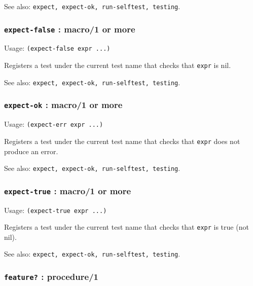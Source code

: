 \documentclass[
]{article}
\newcommand{\passthrough}[1]{#1}
\begin{document}
See also:
\passthrough{\lstinline!expect, expect-ok, run-selftest, testing!}.

\hypertarget{expect-false-macro1-or-more}{%
\subsubsection{\texorpdfstring{\texttt{expect-false} : macro/1 or
more}{expect-false : macro/1 or more}}\label{expect-false-macro1-or-more}}

Usage: \passthrough{\lstinline!(expect-false expr ...)!}

Registers a test under the current test name that checks that
\passthrough{\lstinline!expr!} is nil.

See also:
\passthrough{\lstinline!expect, expect-ok, run-selftest, testing!}.

\hypertarget{expect-ok-macro1-or-more}{%
\subsubsection{\texorpdfstring{\texttt{expect-ok} : macro/1 or
more}{expect-ok : macro/1 or more}}\label{expect-ok-macro1-or-more}}

Usage: \passthrough{\lstinline!(expect-err expr ...)!}

Registers a test under the current test name that checks that
\passthrough{\lstinline!expr!} does not produce an error.

See also:
\passthrough{\lstinline!expect, expect-ok, run-selftest, testing!}.

\hypertarget{expect-true-macro1-or-more}{%
\subsubsection{\texorpdfstring{\texttt{expect-true} : macro/1 or
more}{expect-true : macro/1 or more}}\label{expect-true-macro1-or-more}}

Usage: \passthrough{\lstinline!(expect-true expr ...)!}

Registers a test under the current test name that checks that
\passthrough{\lstinline!expr!} is true (not nil).

See also:
\passthrough{\lstinline!expect, expect-ok, run-selftest, testing!}.

\hypertarget{feature-procedure1}{%
\subsubsection{\texorpdfstring{\texttt{feature?} :
procedure/1}{feature? : procedure/1}}\label{feature-procedure1}}
\end{document}
